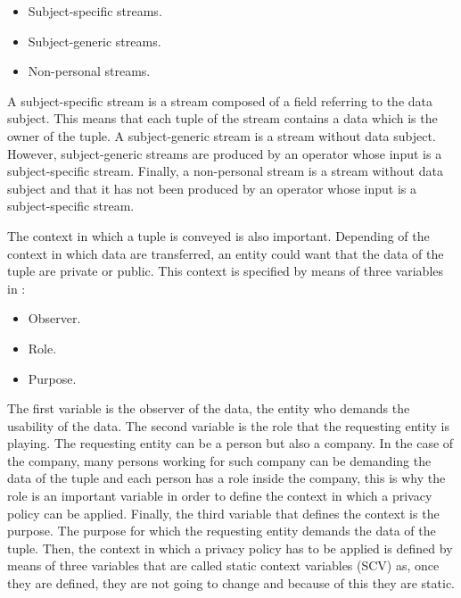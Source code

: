 \begin{itemize}

\item Subject-specific streams.
\item Subject-generic streams.
\item Non-personal streams.

\end{itemize}

A subject-specific stream is a stream composed of a field referring to the data subject. This means that each tuple of the stream contains a data which is the owner of the tuple. A subject-generic stream is a stream without data subject. However, subject-generic streams are produced by an operator whose input is a subject-specific stream. Finally, a non-personal stream is a stream without data subject and that it has not been produced by an operator whose input is a subject-specific stream.

The context in which a tuple is conveyed is also important. Depending of the context in which data are transferred, an entity could want that the data of the tuple are private or public. This context is specified by means of three variables in \cite{privacypoliciesarticle}:

\begin{itemize}

\item Observer.
\item Role.
\item Purpose.

\end{itemize}

The first variable is the observer of the data, the entity who demands the usability of the data. The second variable is the role that the requesting entity is playing. The requesting entity can be a person but also a company. In the case of the company, many persons working for such company can be demanding the data of the tuple and each person has a role inside the company, this is why the role is an important variable in order to define the context in which a privacy policy can be applied. Finally, the third variable that defines the context is the purpose. The purpose for which the requesting entity demands the data of the tuple. Then, the context in which a privacy policy has to be applied is defined by means of three variables that are called static context variables (SCV) as, once they are defined, they are not going to change and because of this they are static.

